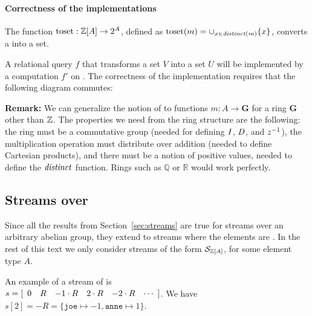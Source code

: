 \paragraph{Correctness of the \dbsp implementations}

The function $\mbox{toset}: \mathbb{Z}[A] \to 2^A$, defined as $\mbox{toset}(m) =
\cup_{x \in \mathit{distinct}(m)} \{ x \}$, converts a \zr into a set.

A relational query $f$ that transforms
a set $V$ into a set $U$ will be implemented by a \dbsp computation $f'$ on
\zrs.  The correctness of the implementation requires that the following
diagram commutes:

\begin{center}
\end{center}

\textbf{Remark:} We can generalize the notion of \zrs to functions $m: A \to \mathbf{G}$ for a
ring $\mathbf{G}$ other than $\mathbb{Z}$.  The properties we need from the ring structure are the
following: the ring must be a commutative group (needed for defining $\mathit{I}$, $\mathit{D}$, and $z^{-1}$),
the multiplication operation must distribute over addition (needed to define
Cartesian products), and there must be a notion of positive values, needed
to define the $\mathit{distinct}$ function.  Rings such as $\mathbb{Q}$ or $\mathbb{R}$
would work perfectly.

\subsection{Streams over \zrs}

Since all the results from Section~\ref{sec:streams} are true for streams
over an arbitrary abelian group, they extend to streams where the elements
are \zrs.  In the rest of this text we only consider streams of the form $\mathcal{S}_{\mathbb{Z}[A]}$, for
some element type $A$.

An example of a stream of \zrs is \\ $s = \sv{0 R -1\cdot{R} 2\cdot{R} -2\cdot{R}}$.
We have $s[2] = -R = \{ \texttt{joe} \mapsto -1, \texttt{anne} \mapsto 1 \}$.

